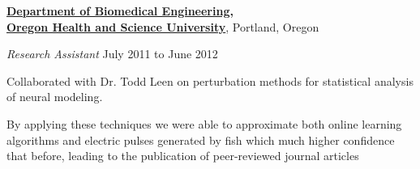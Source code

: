 \documentclass[10pt]{article}
\newenvironment{outerlist}[1][\enskip$\circ$]%
        {\begin{itemize}[#1]}{\end{itemize}%
         \vspace{-.6\baselineskip}}
\newenvironment{innerlist}[1][\enskip$\circ$]%
        {\begin{compactitem}[#1]}{\end{compactitem}}
\begin{document}
\begin{outerlist}
\begin{innerlist}


\end{innerlist}
\end{outerlist}
\medbreak
\href{http://www.ogi.edu/bme}{\textbf{Department of Biomedical Engineering, \\Oregon Health and Science University}},
Portland, Oregon
\begin{outerlist}
\item[] \textit{Research Assistant}%
    \hfill {July 2011 to June 2012}
     \begin{innerlist}
     \item Collaborated with Dr. Todd Leen on perturbation methods for statistical analysis
of neural modeling.
     \item By applying these techniques we were able to approximate  both online learning algorithms and electric pulses generated by fish which much higher confidence that before, leading to the publication of peer-reviewed journal articles
     \end{innerlist}
   \end{outerlist}
  
\end{document}
